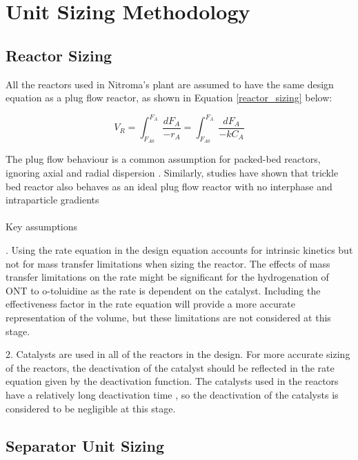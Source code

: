 \section{Unit Sizing Methodology}
\label{app:sizing}
\subsection{Reactor Sizing}

All the reactors used in Nitroma's plant are assumed to have the same design equation as a plug flow reactor, as shown in Equation \ref{reactor_sizing} below:

\begin{equation}
    V_R = \int_{F_{A0}}^{F_{A}} \frac{dF_A}{-r_A} = \int_{F_{A0}}^{F_{A}} \frac{dF_A}{-kC_A}
    \label{reactor_sizing}
\end{equation}

The plug flow behaviour is a common assumption for packed-bed reactors, ignoring axial and radial dispersion \cite{froment_chemical_nodate}. Similarly, studies have shown that  trickle bed reactor also behaves as an ideal plug flow reactor with no interphase and intraparticle gradients \cite{p_a_ramachandran_recent_1987} 

\paragraph{}{Key assumptions}
 
.  Using the rate equation in the design equation accounts for intrinsic kinetics but not for mass transfer limitations when sizing the reactor. The effects of mass transfer limitations on the rate might be significant for the hydrogenation of ONT to o-toluidine as the rate is dependent on the catalyst. Including the effectiveness factor in the rate equation will provide a more accurate representation of the volume, but these limitations are not considered at this stage.

2.  Catalysts are used in all of the reactors in the design. For more accurate sizing of the reactors, the deactivation of the catalyst should be reflected in the rate equation given by the deactivation function. The catalysts used in the reactors have a relatively long deactivation time \cite{temizel_novel_2020}, so the deactivation of the catalysts is considered to be negligible at this stage. 

\subsection{Separator Unit Sizing}


